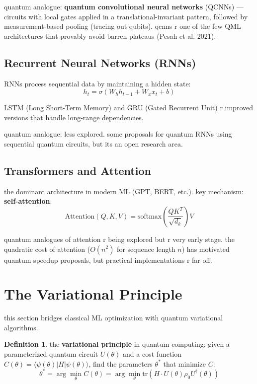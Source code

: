 \documentclass[11pt,a4paper]{article}
\theoremstyle{definition}
\newtheorem{definition}{Definition}[section]
\theoremstyle{remark}
\begin{document}
quantum analogue: \textbf{quantum convolutional neural networks} (QCNNs) --- circuits with local gates applied in a translational-invariant pattern, followed by measurement-based pooling (tracing out qubits). qcnns r one of the few QML architectures that provably avoid barren plateaus (Pesah et al. 2021).

\subsection{Recurrent Neural Networks (RNNs)}

RNNs process sequential data by maintaining a hidden state:
\[
h_t = \sigma(W_h h_{t-1} + W_x x_t + b)
\]

LSTM (Long Short-Term Memory) and GRU (Gated Recurrent Unit) r improved versions that handle long-range dependencies.

quantum analogue: less explored. some proposals for quantum RNNs using sequential quantum circuits, but its an open research area.

\subsection{Transformers and Attention}

the dominant architecture in modern ML (GPT, BERT, etc.). key mechanism: \textbf{self-attention}:
\[
\text{Attention}(Q, K, V) = \text{softmax}\left(\frac{QK^T}{\sqrt{d_k}}\right)V
\]

quantum analogues of attention r being explored but r very early stage. the quadratic cost of attention ($O(n^2)$ for sequence length $n$) has motivated quantum speedup proposals, but practical implementations r far off.

\section{The Variational Principle}

this section bridges classical ML optimization with quantum variational algorithms.

\begin{definition}
the \textbf{variational principle} in quantum computing: given a parameterized quantum circuit $U(\theta)$ and a cost function $C(\theta) = \langle \psi(\theta) | H | \psi(\theta) \rangle$, find the parameters $\theta^*$ that minimize $C$:
\[
\theta^* = \arg\min_\theta C(\theta) = \arg\min_\theta \text{tr}(H \cdot U(\theta)\rho_0 U^\dagger(\theta))
\]
\end{definition}
\end{document}
